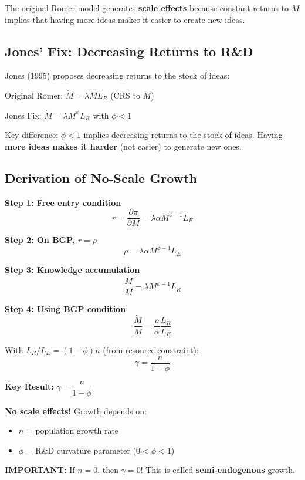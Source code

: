 \begin{tcolorbox}[colback=orange!10,colframe=orange3,title=Key Insight]
The original Romer model generates \textbf{scale effects} because
constant returns to $M$ implies that having more ideas makes it easier
to create new ideas.
\end{tcolorbox}

\subsection{Jones' Fix: Decreasing Returns to R\&D}

Jones (1995) proposes decreasing returns to the stock of ideas:

\begin{derivationbox}
Original Romer: $\dot{M} = \lambda M L_R$ \quad (CRS to $M$)

Jones Fix: $\dot{M} = \lambda M^\phi L_R$ \quad with $\phi < 1$
\bigskip

Key difference: $\phi < 1$ implies decreasing returns to the stock of ideas.
Having \textbf{more ideas makes it harder} (not easier) to generate new ones.
\end{derivationbox}

\subsection{Derivation of No-Scale Growth}

\begin{derivationbox}
\textbf{Step 1: Free entry condition}
\[
r = \frac{\partial \pi}{\partial M} = \lambda \alpha M^{\phi-1} L_E
\tag{Arbitrage}
\]

\textbf{Step 2: On BGP, $r = \rho$}
\[
\rho = \lambda \alpha M^{\phi-1} L_E
\tag{BGP Rate}
\]

\textbf{Step 3: Knowledge accumulation}
\[
\frac{\dot{M}}{M} = \lambda M^{\phi-1} L_R
\tag{Knowledge}
\]

\textbf{Step 4: Using BGP condition}
\[
\frac{\dot{M}}{M} = \frac{\rho}{\alpha} \frac{L_R}{L_E}
\tag{}
\]

With $L_R / L_E = (1-\phi) n$ (from resource constraint):
\[
\boxed{\gamma = \frac{n}{1-\phi}}
\tag{Jones Growth}
\]
\end{derivationbox}

\begin{resultbox}
\textbf{Key Result:} $\gamma = \dfrac{n}{1-\phi}$
\bigskip

\textbf{No scale effects!} Growth depends on:
\begin{itemize}
    \item $n$ = population growth rate
    \item $\phi$ = R\&D curvature parameter ($0 < \phi < 1$)
\end{itemize}
\bigskip

\textbf{IMPORTANT:} If $n = 0$, then $\gamma = 0$!
This is called \textbf{semi-endogenous} growth.
\end{resultbox}

